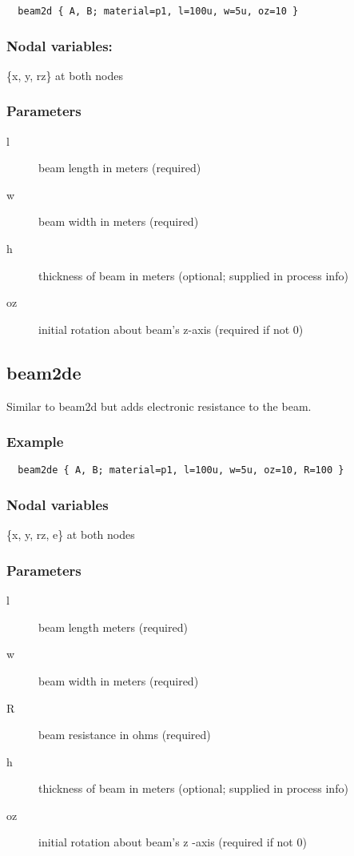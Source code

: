 \begin{verbatim}
  beam2d { A, B; material=p1, l=100u, w=5u, oz=10 }
\end{verbatim}
 
\subsubsection*{Nodal variables:}

\{x, y, rz\} at both nodes 
 
\subsubsection{Parameters}

\begin{description}
 \item[l]  beam length in meters (required) 
 \item[w]  beam width in meters (required) 
 \item[h]  thickness of beam in meters (optional; supplied in process info) 
 \item[oz] initial rotation about beam's z-axis (required if not 0) 
\end{description}

\subsection{beam2de}
 
Similar to beam2d but adds electronic resistance to the beam. 

\subsubsection*{Example}

\begin{verbatim}
  beam2de { A, B; material=p1, l=100u, w=5u, oz=10, R=100 }
\end{verbatim}

 
\subsubsection*{Nodal variables}

\{x, y, rz, e\} at both nodes 
 
\subsubsection*{Parameters}
\begin{description}
 \item[l] beam length meters (required) 
 \item[w] beam width in meters (required) 
 \item[R] beam resistance in ohms (required) 
 \item[h] thickness of beam in meters (optional; supplied in process info) 
 \item[oz] initial rotation about beam's z -axis (required if not 0) 
\end{description}

